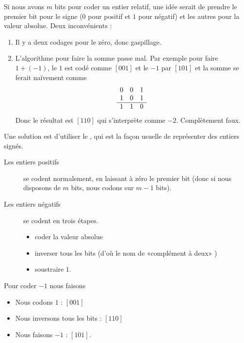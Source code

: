 Si nous avons \( m\) bits pour coder un entier relatif, une idée serait de prendre le premier bit pour le signe (\( 0\) pour positif et \( 1\) pour négatif) et les autres pour la valeur absolue. Deux inconvénients :
\begin{enumerate}
	\item
	      Il y a deux codages pour le zéro, donc gaspillage.
	\item
	      L'algorithme pour faire la somme passe mal. Par exemple pour faire \( 1+(-1)\), le \( 1\) est codé comme \( [001]\) et le \( -1\) par \( [101]\) et la somme se ferait naïvement comme
	      \begin{equation*}
		      \begin{array}[]{ccc}
			      0 & 0 & 1 \\
			      1 & 0 & 1 \\
			      \hline
			      1 & 1 & 0 \\
		      \end{array}
	      \end{equation*}
	      Donc le résultat est \( [110]\) qui s'interprète comme \( -2\). Complètement faux.
\end{enumerate}
Une solution est d'utiliser le , qui est la façon usuelle de représenter des entiers signés.
\begin{description}
	\item[Les entiers positifs] se codent normalement, en laissant à zéro le premier bit (donc si nous disposons de \( m\) bits, nous codons sur \( m-1\) bits).
	\item[Les entiers négatifs] se codent en trois étapes.
	      \begin{itemize}
		      \item coder la valeur absolue
		      \item inverser tous les bits (d'où le nom de «complément à deux» )
		      \item soustraire \( 1\).
	      \end{itemize}
\end{description}

\begin{example}
	Pour coder \( -1\) nous faisons
	\begin{itemize}
		\item Nous codons \( 1\) : \( [001]\)
		\item Nous inversons tous les bits : \( [110]\)
		\item Nous faisons \( -1\) : \( [101]\).
	\end{itemize}
\end{example}

